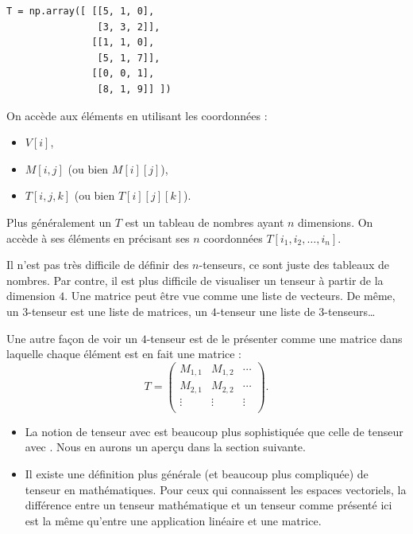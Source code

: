 \documentclass[11pt,class=report,crop=false]{standalone}
\begin{document}
\medskip

\begin{minipage}{0.4\textwidth}
\end{minipage}
\begin{minipage}{0.4\textwidth}
\begin{lstlisting}
T = np.array([ [[5, 1, 0], 
	            [3, 3, 2]],
	           [[1, 1, 0], 
	            [5, 1, 7]], 
	           [[0, 0, 1], 
	            [8, 1, 9]] ])
\end{lstlisting}
\end{minipage}


\medskip

On accède aux éléments en utilisant les coordonnées :
\begin{itemize}
  \item $V[i]$,
  \item $M[i,j]$ (ou bien $M[i][j]$),
  \item $T[i,j,k]$ (ou bien $T[i][j][k]$).
\end{itemize}

Plus généralement un  $T$ est un tableau de nombres ayant $n$ dimensions.
On accède à ses éléments en précisant ses $n$ coordonnées $T[i_1,i_2,\ldots,i_n]$.

Il n'est pas très difficile de définir des $n$-tenseurs, ce sont juste des tableaux de nombres. Par contre, il est plus difficile de visualiser un tenseur à partir de la dimension $4$.
Une matrice peut être vue comme une liste de vecteurs. De même, un $3$-tenseur est une liste de matrices, un $4$-tenseur une liste de $3$-tenseurs\ldots

Une autre façon de voir un $4$-tenseur est de le présenter comme une matrice dans laquelle chaque élément est en fait une matrice :
$$T = \begin{pmatrix}
M_{1,1} & M_{1,2} & \cdots \\
M_{2,1} & M_{2,2} & \cdots \\
\vdots & \vdots   & \vdots \\
\end{pmatrix}.$$



\begin{remarque*}
\sauteligne
\begin{itemize}

  \item La notion de tenseur avec \tensorflow{} est beaucoup plus sophistiquée que celle de tenseur avec \numpy. Nous en aurons un aperçu dans la section suivante.
  
  \item Il existe une définition plus générale (et beaucoup plus compliquée) de tenseur en mathématiques. Pour ceux qui connaissent les espaces vectoriels, la différence entre un tenseur mathématique et un tenseur comme présenté ici est la même qu'entre une application linéaire et une matrice.
\end{itemize}

\end{remarque*}
\end{document}
